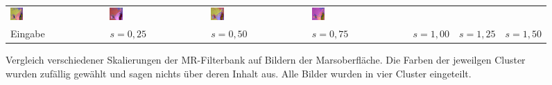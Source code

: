 \begin{figure}[h!]
\begin{tabular}{p{}p{}p{}p{}p{}p{}p{}}
		\includegraphics[width=0.14\textwidth]{images/gen/filter_size/p03_04.png_0.75.png} &
		\includegraphics[width=0.14\textwidth]{images/gen/filter_size/p03_04.png_1.00.png} &
		\includegraphics[width=0.14\textwidth]{images/gen/filter_size/p03_04.png_1.25.png} &
		\includegraphics[width=0.14\textwidth]{images/gen/filter_size/p03_04.png_1.50.png} \\
		
		\hspace{2pt}\newline\centering Eingabe & 
		\hspace{2pt}\newline\centering $s=0,25$ &
		\hspace{2pt}\newline\centering $s=0,50$ &
		\hspace{2pt}\newline\centering $s=0,75$ &
		\hspace{2pt}\newline\centering $s=1,00$ &
		\hspace{2pt}\newline\centering $s=1,25$ &
		\hspace{2pt}\newline\centering $s=1,50$
	\end{tabular}
	\caption{Vergleich verschiedener Skalierungen der MR-Filterbank auf Bildern der Marsoberfläche. Die Farben der jeweilgen Cluster wurden zufällig gewählt und sagen nichts über deren Inhalt aus. Alle Bilder wurden in vier Cluster eingeteilt.}
	\label{fig:filterbank_sizes}
\end{figure}

